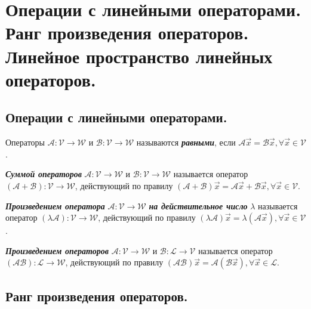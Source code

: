 \section{
    Операции с линейными операторами. Ранг произведения операторов. Линейное пространство линейных операторов.
}

\subsection{
    Операции с линейными операторами.
}

\begin{definition}
    Операторы $\mathscr{A} \colon \mathcal{V} \to \mathcal{W}$ и $\mathscr{B} \colon \mathcal{V} \to \mathcal{W}$ называются \textbf{\textit{равными}}, если $\mathscr{A}\vec{x} = \mathscr{B}\vec{x}, \forall \vec{x} \in \mathcal{V}$.
\end{definition}

\begin{definition}
    \textbf{\textit{Суммой операторов}} $\mathscr{A} \colon \mathcal{V} \to \mathcal{W}$ и $\mathscr{B} \colon \mathcal{V} \to \mathcal{W}$ называется оператор $(\mathscr{A} + \mathscr{B}) \colon \mathcal{V} \to \mathcal{W}$, действующий по правилу $(\mathscr{A} + \mathscr{B})\vec{x} = \mathscr{A}\vec{x} + \mathscr{B}\vec{x}, \forall \vec{x} \in \mathcal{V}$.
\end{definition}

\begin{definition}
    \textbf{\textit{Произведением оператора}} $\mathscr{A} \colon \mathcal{V} \to \mathcal{W}$ \textbf{\textit{на действительное число}} $\lambda$ называется оператор $(\lambda\mathscr{A}) \colon \mathcal{V} \to \mathcal{W}$, действующий по правилу $(\lambda\mathscr{A})\vec{x} = \lambda(\mathscr{A}\vec{x}), \forall \vec{x} \in \mathcal{V}$.
\end{definition}

\begin{definition}
    \textbf{\textit{Произведением операторов}} $\mathscr{A} \colon \mathcal{V} \to \mathcal{W}$ и $\mathscr{B} \colon \mathcal{L} \to \mathcal{V}$ называется оператор $(\mathscr{A}\mathscr{B}) \colon \mathcal{L} \to \mathcal{W}$, действующий по правилу $(\mathscr{A}\mathscr{B})\vec{x} = \mathscr{A}(\mathscr{B}\vec{x}), \forall \vec{x} \in \mathcal{L}$.
\end{definition}


\newpage


\subsection{
    Ранг произведения операторов.
}

